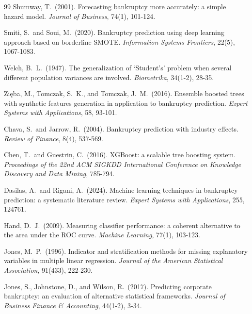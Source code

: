 \documentclass[12pt,a4paper]{article}
\begin{document}
\begin{thebibliography}{99}
Shumway, T.\ (2001).
\newblock Forecasting bankruptcy more accurately: a simple hazard model.
\newblock \textit{Journal of Business}, 74(1), 101-124.

Smiti, S.\ and Soui, M.\ (2020).
\newblock Bankruptcy prediction using deep learning approach based on
borderline SMOTE.
\newblock \textit{Information Systems Frontiers}, 22(5), 1067-1083.

Welch, B.\ L.\ (1947).
\newblock The generalization of `Student's' problem when several different
population variances are involved.
\newblock \textit{Biometrika}, 34(1-2), 28-35.

Zięba, M., Tomczak, S.\ K., and Tomczak, J.\ M.\ (2016).
\newblock Ensemble boosted trees with synthetic features generation in
application to bankruptcy prediction.
\newblock \textit{Expert Systems with Applications}, 58, 93-101.


Chava, S.\ and Jarrow, R.\ (2004).
\newblock Bankruptcy prediction with industry effects.
\newblock \textit{Review of Finance}, 8(4), 537-569.

Chen, T.\ and Guestrin, C.\ (2016).
\newblock XGBoost: a scalable tree boosting system.
\newblock \textit{Proceedings of the 22nd ACM SIGKDD International Conference
on Knowledge Discovery and Data Mining}, 785-794.

Dasilas, A.\ and Rigani, A.\ (2024).
\newblock Machine learning techniques in bankruptcy prediction: a systematic
literature review.
\newblock \textit{Expert Systems with Applications}, 255, 124761.

Hand, D.\ J.\ (2009).
\newblock Measuring classifier performance: a coherent alternative to the area
under the ROC curve.
\newblock \textit{Machine Learning}, 77(1), 103-123.

Jones, M.\ P.\ (1996).
\newblock Indicator and stratification methods for missing explanatory variables
in multiple linear regression.
\newblock \textit{Journal of the American Statistical Association}, 91(433),
222-230.

Jones, S., Johnstone, D., and Wilson, R.\ (2017).
\newblock Predicting corporate bankruptcy: an evaluation of alternative
statistical frameworks.
\newblock \textit{Journal of Business Finance \& Accounting}, 44(1-2), 3-34.


\end{thebibliography}
\end{document}
